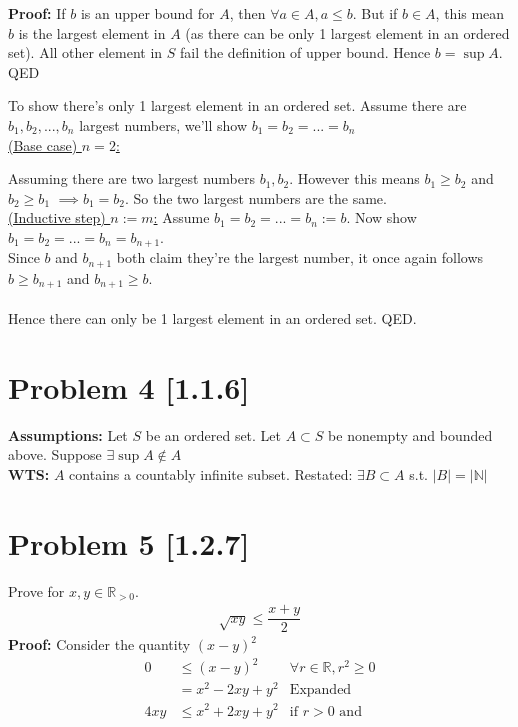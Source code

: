 \documentclass[12pt,fleqn]{article}
\numberwithin{equation}{section} %
\begin{document}
\textbf{Proof:} If $b$ is an upper bound for $A$, then $\forall a \in A, a \leq b$. But if $b \in A$, this mean $b$ is the largest element in $A$ (as there can be only 1 largest element in an ordered set). All other element in $S$ fail the definition of upper bound. Hence $b = \sup A$.\\

QED

\begin{sidework}
	To show there's only 1 largest element in an ordered set. Assume there are $b_1, b_2, ..., b_n$ largest numbers, we'll show $b_1 = b_2 = ... = b_n$\\
	
	\underline{(Base case) $n=2$:}
	
	Assuming there are two largest numbers $b_1, b_2$. However this means $b_1 \geq b_2$ and $b_2 \geq b_1$ $\implies b_1 = b_2$. So the two largest numbers are the same.
	\\
	
	\underline{(Inductive step) $n:= m$:}
	Assume $b_1 = b_2 = ... = b_n := b$. Now show $b_1 = b_2 = ... = b_n = b_{n+1}$.\\
	Since $b$ and $b_{n+1}$ both claim they're the largest number, it once again follows $b \geq b_{n+1}$ and $b_{n+1} \geq b$.  \\
	\\
	
	Hence there can only be 1 largest element in an ordered set. QED.
\end{sidework}

\section*{Problem 4 [1.1.6]}
\textbf{Assumptions:} Let $S$ be an ordered set. Let $A \subset S$ be nonempty and bounded above. Suppose $\exists \sup A \notin A$ \\
\textbf{WTS:} $A$ contains a countably infinite subset. Restated: $\exists B \subset A$ s.t. $|B| = |\mathbb N|$




\section*{Problem 5 [1.2.7]} Prove for $x,y \in \mathbb R_{>0}$.
\begin{align}
	\sqrt {xy} \leq \dfrac{x + y}{2	}
\end{align}
\textbf{Proof:}
Consider the quantity $(x-y)^2$
\begin{align}
 	0 & \leq (x - y)^2   & \forall r \in \mathbb R, r^2 \geq 0\\
 	 &  = x^2 - 2 xy + y^2 & \text{Expanded}\\
   4 xy  & \leq x^2 + 2 xy + y^2 & \text{if } r > 0 \text{ and }  
\end{align}

















 
\end{document}
